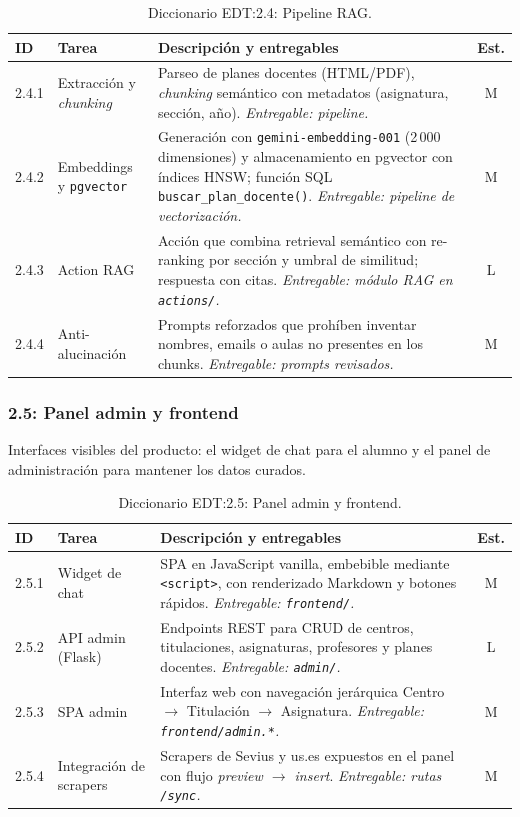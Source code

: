\begin{table}[hbtp]
\centering
\small
\begin{tabular}{|l|l|p{7.5cm}|c|}
\hline
\textbf{ID} & \textbf{Tarea} & \textbf{Descripción y entregables} & \textbf{Est.} \\ \hline
2.4.1 & Extracción y \textit{chunking} & Parseo de planes docentes (HTML/PDF), \textit{chunking} semántico con metadatos (asignatura, sección, año). \textit{Entregable: pipeline.} & M \\ \hline
2.4.2 & Embeddings y \texttt{pgvector} & Generación con \texttt{gemini-embedding-001} (2\,000 dimensiones) y almacenamiento en pgvector con índices HNSW; función SQL \texttt{buscar\_plan\_docente()}. \textit{Entregable: pipeline de vectorización.} & M \\ \hline
2.4.3 & Action RAG & Acción que combina retrieval semántico con re-ranking por sección y umbral de similitud; respuesta con citas. \textit{Entregable: módulo RAG en \texttt{actions/}.} & L \\ \hline
2.4.4 & Anti-alucinación & Prompts reforzados que prohíben inventar nombres, emails o aulas no presentes en los chunks. \textit{Entregable: prompts revisados.} & M \\ \hline
\end{tabular}
\caption{Diccionario EDT:2.4: Pipeline RAG.}
\label{tab:dict-2-4}
\end{table}

\subsubsection{2.5: Panel admin y frontend}\label{subsubsec:admin-frontend}

Interfaces visibles del producto: el widget de chat para el alumno y el panel de administración para mantener los datos curados.

\begin{table}[hbtp]
\centering
\small
\begin{tabular}{|l|l|p{7.5cm}|c|}
\hline
\textbf{ID} & \textbf{Tarea} & \textbf{Descripción y entregables} & \textbf{Est.} \\ \hline
2.5.1 & Widget de chat & SPA en JavaScript vanilla, embebible mediante \texttt{<script>}, con renderizado Markdown y botones rápidos. \textit{Entregable: \texttt{frontend/}.} & M \\ \hline
2.5.2 & API admin (Flask) & Endpoints REST para CRUD de centros, titulaciones, asignaturas, profesores y planes docentes. \textit{Entregable: \texttt{admin/}.} & L \\ \hline
2.5.3 & SPA admin & Interfaz web con navegación jerárquica Centro $\rightarrow$ Titulación $\rightarrow$ Asignatura. \textit{Entregable: \texttt{frontend/admin.*}.} & M \\ \hline
2.5.4 & Integración de scrapers & Scrapers de Sevius y us.es expuestos en el panel con flujo \textit{preview $\rightarrow$ insert}. \textit{Entregable: rutas \texttt{/sync}.} & M \\ \hline
\end{tabular}
\caption{Diccionario EDT:2.5: Panel admin y frontend.}
\label{tab:dict-2-5}
\end{table}


